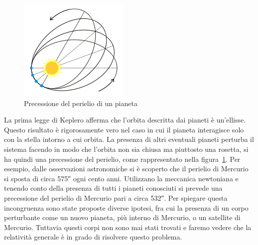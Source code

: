 \begin{figure}
  \centering
  \includegraphics{figure/precessione_perielio}
  \caption{Precessione del perielio di un pianeta}
  \label{fig:precessione-perielio}
\end{figure}
La prima legge di Keplero afferma che l'orbita descritta dai pianeti è
un'ellisse.  Questo risultato è rigorosamente vero nel caso in cui il pianeta
interagisce solo con la stella intorno a cui orbita.  La presenza di altri
eventuali pianeti perturba il sistema facendo in modo che l'orbita non sia
chiusa ma piuttosto una rosetta, si ha quindi una precessione del perielio, come
rappresentato nella figura~\ref{fig:precessione-perielio}.  Per esempio, dalle
osservazioni astronomiche si è scoperto che il perielio di Mercurio si sposta di
circa \ang{;;575} ogni cento anni.  Utilizzano la meccanica newtoniana e tenendo
conto della presenza di tutti i pianeti conosciuti si prevede una precessione
del perielio di Mercurio pari a circa \ang{;;532}.  Per spiegare questa
incongruenza sono state proposte diverse ipotesi, fra cui la presenza di un
corpo perturbante come un nuovo pianeta, più interno di Mercurio, o un satellite
di Mercurio.  Tuttavia questi corpi non sono mai stati trovati e faremo vedere
che la relatività generale è in grado di risolvere questo problema.

